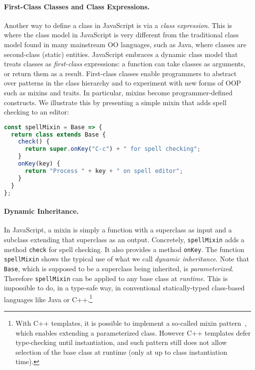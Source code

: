 \paragraph{First-Class Classes and Class Expressions.}

Another way to define a class in JavaScript is via a \emph{class expression}. This is where the class
model in JavaScript is very different from the traditional class model found in
many mainstream OO languages, such as Java, where classes are second-class
(static) entities. JavaScript embraces a dynamic class model that treats classes
as \emph{first-class} expressions: a function can take classes as arguments,
or return them as a result. First-class classes enable programmers to
abstract over patterns in the class hierarchy and to experiment with new forms of OOP
such as mixins and traits. In particular, mixins become programmer-defined
constructs. We illustrate this by presenting a simple mixin that adds
spell checking to an editor:
\begin{lstlisting}[language=JavaScript]
const spellMixin = Base => {
  return class extends Base {
    check() {
      return super.onKey("C-c") + " for spell checking";
    }
    onKey(key) {
      return "Process " + key + " on spell editor";
    }
  }
};
\end{lstlisting}

\paragraph{Dynamic Inheritance.}

In JavaScript, a mixin is simply a function with a superclass as input and a
subclass extending that superclass as an output. Concretely, \lstinline{spellMixin}
adds a method \lstinline{check} for spell checking. It also provides
a method \lstinline{onKey}.
The function \lstinline{spellMixin} shows the typical use of what we call \emph{dynamic inheritance}.
Note that \lstinline{Base}, which is supposed to be a superclass being inherited, is \emph{parameterized}.
Therefore \lstinline{spellMixin} can be applied to any base class at
\emph{runtime}. This is impossible to do, in a type-safe way, in
conventional statically-typed class-based languages like Java or
C++.\footnote{With C++ templates, it is possible to
  implement a so-called mixin pattern~\citep{DBLP:conf/gcse/SmaragdakisB00}, which enables extending
a parameterized class. However C++ templates defer type-checking until
instantiation, and such pattern still does not allow selection of the
base class at runtime (only at up to class instantiation time).}

